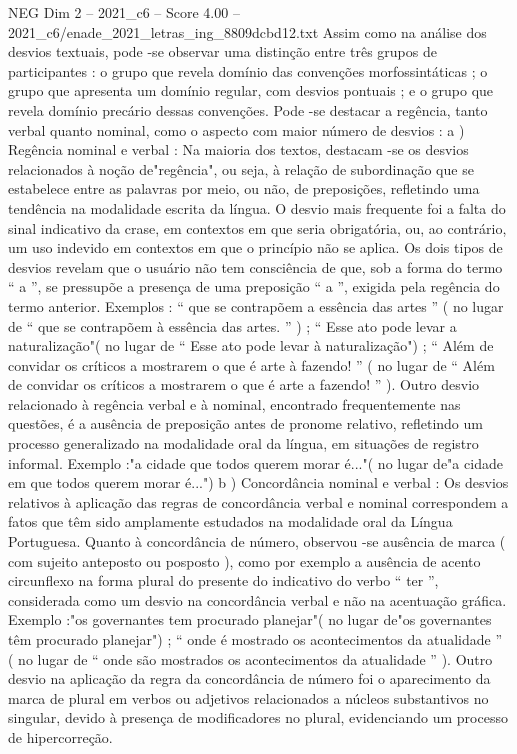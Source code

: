 \begin{textsample}{NEG Dim 2 – 2021\_c6 – Score 4.00 – 2021\_c6/enade\_2021\_letras\_ing\_8809dcbd12.txt}
Assim como na análise dos desvios textuais, pode -se observar uma distinção entre três grupos de participantes : o grupo que revela domínio das convenções morfossintáticas ; o grupo que apresenta um domínio regular, com desvios pontuais ; e o grupo que revela domínio precário dessas convenções.
Pode -se destacar a regência, tanto verbal quanto nominal, como o aspecto com maior número de desvios : a ) Regência nominal e verbal : Na maioria dos textos, destacam -se os desvios relacionados à noção de"regência", ou seja, à relação de subordinação que se estabelece entre as palavras por meio, ou não, de preposições, refletindo uma tendência na modalidade escrita da língua.
O desvio mais frequente foi a falta do sinal indicativo da crase, em contextos em que seria obrigatória, ou, ao contrário, um uso indevido em contextos em que o princípio não se aplica.
Os dois tipos de desvios revelam que o usuário não tem consciência de que, sob a forma do termo “ a ”, se pressupõe a presença de uma preposição “ a ”, exigida pela regência do termo anterior.
Exemplos : “ que se contrapõem a essência das artes ” ( no lugar de “ que se contrapõem à essência das artes. ” ) ; “ Esse ato pode levar a naturalização"( no lugar de “ Esse ato pode levar à naturalização") ; “ Além de convidar os críticos a mostrarem o que é arte à fazendo! ” ( no lugar de “ Além de convidar os críticos a mostrarem o que é arte a fazendo! ” ).
Outro desvio relacionado à regência verbal e à nominal, encontrado frequentemente nas questões, é a ausência de preposição antes de pronome relativo, refletindo um processo generalizado na modalidade oral da língua, em situações de registro informal.
Exemplo :"a cidade que todos querem morar é..."( no lugar de"a cidade em que todos querem morar é...") b ) Concordância nominal e verbal : Os desvios relativos à aplicação das regras de concordância verbal e nominal correspondem a fatos que têm sido amplamente estudados na modalidade oral da Língua Portuguesa.
Quanto à concordância de número, observou -se ausência de marca ( com sujeito anteposto ou posposto ), como por exemplo a ausência de acento circunflexo na forma plural do presente do indicativo do verbo “ ter ”, considerada como um desvio na concordância verbal e não na acentuação gráfica.
Exemplo :"os governantes tem procurado planejar"( no lugar de"os governantes têm procurado planejar") ; “ onde é mostrado os acontecimentos da atualidade ” ( no lugar de “ onde são mostrados os acontecimentos da atualidade ” ).
Outro desvio na aplicação da regra da concordância de número foi o aparecimento da marca de plural em verbos ou adjetivos relacionados a núcleos substantivos no singular, devido à presença de modificadores no plural, evidenciando um processo de hipercorreção.

\end{textsample}
